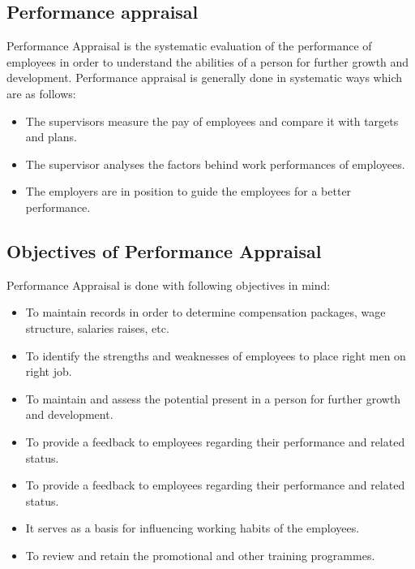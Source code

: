 \documentclass[]{book}
\providecommand{\tightlist}{%
  \setlength{\itemsep}{0pt}\setlength{\parskip}{0pt}}
\begin{document}
\hypertarget{performance-appraisal}{%
\subsection{Performance appraisal}\label{performance-appraisal}}

Performance Appraisal is the systematic evaluation of the performance of employees in order to understand the abilities of a person for further growth and development. \citep{MSG2018} Performance appraisal is generally done in systematic ways which are as follows:

\begin{itemize}
\tightlist
\item
  The supervisors measure the pay of employees and compare it with targets and plans.
\item
  The supervisor analyses the factors behind work performances of employees.
\item
  The employers are in position to guide the employees for a better performance.
\end{itemize}

\hypertarget{objectives-of-performance-appraisal}{%
\subsection{Objectives of Performance Appraisal}\label{objectives-of-performance-appraisal}}

Performance Appraisal is done with following objectives in mind:

\begin{itemize}
\tightlist
\item
  To maintain records in order to determine compensation packages, wage structure, salaries raises, etc.
\item
  To identify the strengths and weaknesses of employees to place right men on right job.
\item
  To maintain and assess the potential present in a person for further growth and development.
\item
  To provide a feedback to employees regarding their performance and related status.
\item
  To provide a feedback to employees regarding their performance and related status.
\item
  It serves as a basis for influencing working habits of the employees.
\item
  To review and retain the promotional and other training programmes.
\end{itemize}
\end{document}
